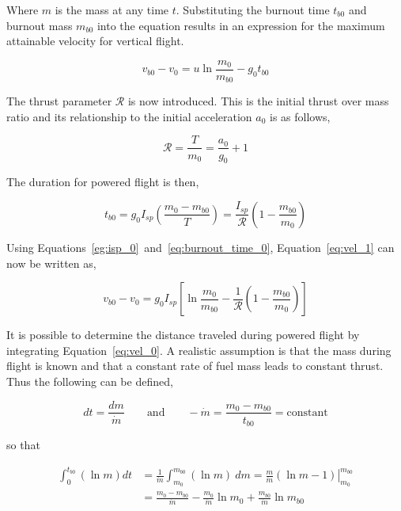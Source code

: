 Where $m$ is the mass at any time $t$. Substituting the burnout time $t_{b0}$ and burnout mass $m_{b0}$ into the equation results in an expression for the maximum attainable velocity for vertical flight.

\begin{equation}
    \label{eq:vel_1}
    v_{b0} - v_0 = u \ln{\frac{m_0}{m_{b0}}} - g_{0}t_{b0}
\end{equation}

The thrust parameter $\mathscr{R}$ is now introduced. This is the initial thrust over mass ratio and its relationship to the initial acceleration $a_0$ is as follows,

\begin{equation}
    \mathscr{R} = \frac{T}{m_0} = \frac{a_0}{g_{0}} + 1
\end{equation}

The duration for powered flight is then,

\begin{equation}
    \label{eq:burnout_time_0}
    t_{b0} = g_{0}I_{sp} \left ( \frac{m_0 - m_{b0}}{T} \right ) = \frac{I_{sp}}{\mathscr{R}} \left ( 1 - \frac{m_{b0}}{m_0} \right )
\end{equation}

Using Equations~\eqref{eg:isp_0}~and~\eqref{eq:burnout_time_0}, Equation~\eqref{eq:vel_1} can now be written as,

\begin{equation}
    \label{eq:vel_2}
    v_{b0} - v_0 = g_{0}I_{sp} \left [ \ln{\frac{m_0}{m_{b0}}} - \frac{1}{\mathscr{R}} \left ( 1 - \frac{m_{b0}}{m_0} \right ) \right ]
\end{equation}


It is possible to determine the distance traveled during powered flight by integrating Equation~\eqref{eq:vel_0}. A realistic assumption is that the mass during flight is known and that a constant rate of fuel mass leads to constant thrust. Thus the following can be defined,

\begin{equation}
    dt=\frac{dm}{\dot{m}} \qquad \text{and} \qquad -\dot{m} = \frac{m_0 - m_{b0}}{t_{b0}} = \text{constant}
\end{equation}

so that


\begin{align}
    \int_0^{t_{b0}}{\left ( \ln{m} \right ) dt}     
    &= \frac{1}{\dot{m}} \int_{m_0}^{m_{b0}}{\left ( \ln{m} \right)}\ dm 
    = \left . \frac{m}{\dot{m}} \left ( \ln{m} - 1\right) \right |_{m_0}^{m_{b0}} \\
    &= \frac{m_0 - m_{b0}}{\dot{m}}-\frac{m_0}{\dot{m}}\ln{m_0} + \frac{m_{b0}}{\dot{m}} \ln{m_{b0}}
\end{align}   


